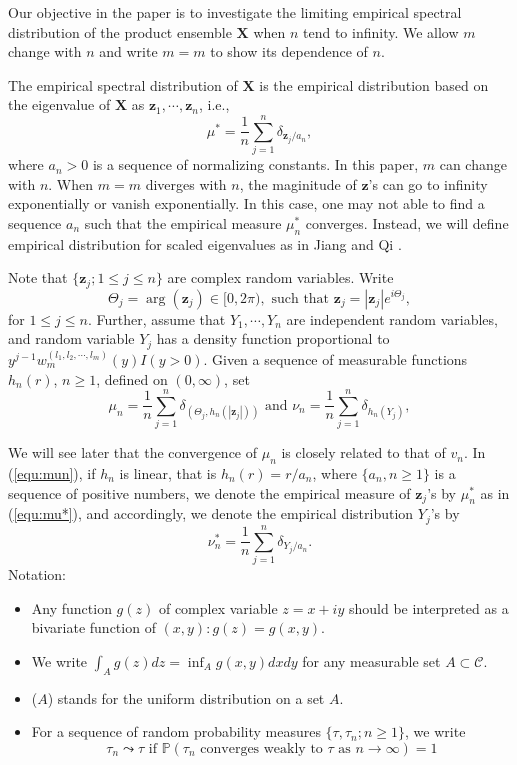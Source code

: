 \documentclass[12pt]{article}
\theoremstyle{plain}
\theoremstyle{definition}
\theoremstyle{remark}
\begin{document}
Our objective in the paper is to investigate the limiting empirical spectral distribution of the product ensemble $\mathbf{X}$ when $n$ tend to infinity. We allow $m$ change with $n$ and write $m=m$ to show its dependence of $n$.

The empirical spectral distribution of $\mathbf{X}$ is the empirical distribution based on the eigenvalue of $\mathbf{X}$ as $\mathbf{z}_{1}, \cdots, \mathbf{z}_{n}$, i.e., 
\begin{equation}\label{equ:mu*}
\mu^*=\frac{1}{n}\sum_{j=1}^n \delta_{\mathbf{z}_j/a_n},
\end{equation}
where $a_n>0$ is a sequence of normalizing constants. In this paper, $m$ can change with $n$. When $m=m$ diverges with $n$, the maginitude of $\mathbf{z}$'s can go to infinity exponentially or vanish exponentially. In this case, one may not able to find a sequence $a_n$ such that the empirical measure $\mu_n^*$ converges. Instead, we will define empirical distribution for scaled eigenvalues as in Jiang and Qi \cite{JiangQi2019}.

Note that $\{ \mathbf{z}_j;1\leq j\leq n \}$ are complex random variables. Write 
$$
\Theta_j=\arg(\mathbf{z}_j)\in[0,2\pi), \text{ such that }\mathbf{z}_j=|\mathbf{z}_j|e^{i\Theta_j},
$$
for $1\leq j\leq n$. Further, assume that $Y_1,\cdots,Y_n$ are independent random variables, and random variable $Y_j$ has a density function proportional to $y^{j-1}w_m^{(l_1,l_2,\cdots,l_m)}(y)I(y>0)$. Given a sequence of measurable functions $h_n(r)$, $n\geq 1$, defined on $(0,\infty)$, set
\begin{equation}\label{equ:mun}
\mu_{n}=\frac{1}{n} \sum_{j=1}^{n} \delta_{\left(\Theta_{j}, h_{n}\left(\left|\mathbf{z}_{j}\right|\right)\right)} \text { and } \nu_{n}=\frac{1}{n} \sum_{j=1}^{n} \delta_{h_{n}\left({Y_{j}}\right)},
\end{equation}

We will see later that the convergence of $\mu_n$ is closely related to that of $v_n$. In (\ref{equ:mun}), if $h_n$ is linear, that is $h_n(r)=r/a_n$, where $\{ a_n,n\geq 1 \}$ is a sequence of positive numbers, we denote the empirical measure of $\mathbf{z}_j$'s by $\mu_n^*$ as in (\ref{equ:mu*}), and accordingly, we denote the empirical distribution $Y_j$'s by
$$
\nu_n^*=\frac{1}{n} \sum_{j=1}^{n} \delta_{{Y_{j}}/a_n}.
$$
Notation:
\begin{itemize}
    \item Any function $g(z)$ of complex variable $z=x+iy$ should be interpreted as a bivariate function of $(x,y):g(z)=g(x,y)$.
    \item We write $\int_Ag(z)dz=\inf_Ag(x,y)dxdy$ for any measurable set $A\subset \mathcal{C}$.
    \item {}($A$) stands for the uniform distribution on a set $A$.
    \item For a sequence of random probability measures $\{ \tau,\tau_n;n\geq 1 \}$, we write 
    \begin{equation}\label{equ:leadsto converge}
    \tau_{n} \leadsto \tau \text { if } \mathbb{P}\left(\tau_{n} \text { converges weakly to } \tau \text { as } n \rightarrow \infty\right)=1
    \end{equation}
\end{itemize}
\end{document}
